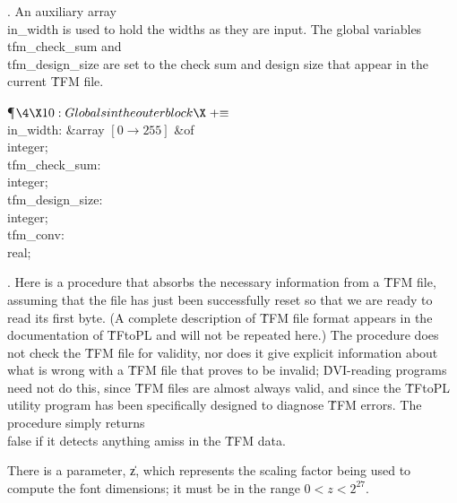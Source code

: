 . An auxiliary array \\{in\_width} is used to hold the widths as they are
input. The global variables \\{tfm\_check\_sum} and \\{tfm\_design\_size} are
set to the check sum and design size that
appear in the current \.{TFM} file.

\Y\P$\4\X10:Globals in the outer block\X\mathrel{+}\S$\6
\4\\{in\_width}: \&{array} $[0\to255]$ \1\&{of}\5
\\{integer};\2\6
\4\\{tfm\_check\_sum}: \\{integer};\6
\4\\{tfm\_design\_size}: \\{integer};\6
\4\\{tfm\_conv}: \\{real};\par
\fi

. Here is a procedure that absorbs the necessary information from a
\.{TFM} file, assuming that the file has just been successfully reset
so that we are ready to read its first byte. (A complete description of
\.{TFM} file format appears in the documentation of \.{TFtoPL} and will
not be repeated here.) The procedure does not check the \.{TFM} file
for validity, nor does it give explicit information about what is
wrong with a \.{TFM} file that proves to be invalid; \.{DVI}-reading
programs need not do this, since \.{TFM} files are almost always valid,
and since the \.{TFtoPL} utility program has been specifically designed
to diagnose \.{TFM} errors. The procedure simply returns \\{false} if it
detects anything amiss in the \.{TFM} data.

There is a parameter, \|z, which represents the scaling factor being
used to compute the font dimensions; it must be in the range $0<z<2^{27}$.

